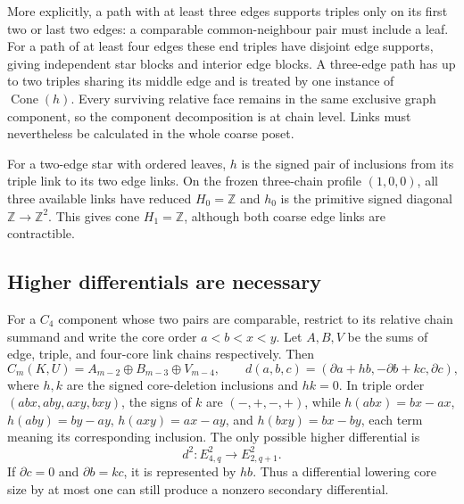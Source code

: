 \documentclass[11pt]{article}
\begin{document}
More explicitly, a path with at least three edges supports triples only
on its first two or last two edges: a comparable common-neighbour pair
must include a leaf.  For a path of at least four edges these end triples
have disjoint edge supports, giving independent star blocks and interior
edge blocks.  A three-edge path has up to two triples sharing its middle
edge and is treated by one instance of $\operatorname{Cone}(h)$.
Every surviving relative face remains in the same exclusive graph
component, so the component decomposition is at chain level.  Links
must nevertheless be calculated in the whole coarse poset.

For a two-edge star with ordered leaves, $h$ is the signed pair of
inclusions from its triple link to its two edge links.  On the frozen
three-chain profile $(1,0,0)$, all three available links have reduced
$H_0=\mathbb Z$ and $h_0$ is the primitive signed diagonal
$\mathbb Z\to\mathbb Z^2$.  This gives cone $H_1=\mathbb Z$,
although both coarse edge links are contractible.

\subsection{Higher differentials are necessary}
For a $C_4$ component whose two pairs are comparable, restrict to its
relative chain summand and write the core order
$a<b<x<y$.  Let $A,B,V$ be the sums of edge, triple, and four-core link
chains respectively.  Then
\[
 C_m(K,U)=A_{m-2}\oplus B_{m-3}\oplus V_{m-4},\qquad
 d(a,b,c)=(\partial a+hb,-\partial b+kc,\partial c),
\]
where $h,k$ are the signed core-deletion inclusions and $hk=0$.
In triple order $(abx,aby,axy,bxy)$, the signs of $k$ are $(-,+,-,+)$,
while $h(abx)=bx-ax$, $h(aby)=by-ay$, $h(axy)=ax-ay$, and
$h(bxy)=bx-by$, each term meaning its corresponding inclusion.
The only possible higher differential is
\[
 d^2:E^2_{4,q}\longrightarrow E^2_{2,q+1}.
\]
If $\partial c=0$ and $\partial b=kc$, it is represented by $hb$.
Thus a differential lowering core size by at most one can still produce
a nonzero secondary differential.
\end{document}

